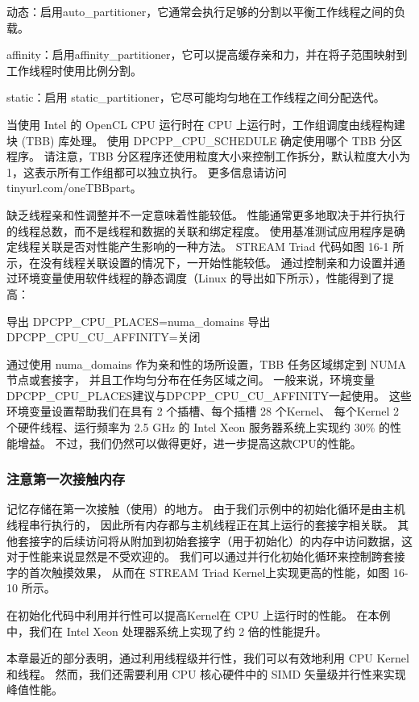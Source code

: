 动态：启用auto\_partitioner，它通常会执行足够的分割以平衡工作线程之间的负载。

affinity：启用affinity\_partitioner，它可以提高缓存亲和力，并在将子范围映射到工作线程时使用比例分割。

static：启用 static\_partitioner，它尽可能均匀地在工作线程之间分配迭代。

当使用 Intel 的 OpenCL CPU 运行时在 CPU 上运行时，工作组调度由线程构建块 (TBB) 库处理。 
使用 DPCPP\_CPU\_SCHEDULE 确定使用哪个 TBB 分区程序。 
请注意，TBB 分区程序还使用粒度大小来控制工作拆分，默认粒度大小为 1，这表示所有工作组都可以独立执行。 
更多信息请访问tinyurl.com/oneTBBpart。

缺乏线程亲和性调整并不一定意味着性能较低。 
性能通常更多地取决于并行执行的线程总数，而不是线程和数据的关联和绑定程度。 
使用基准测试应用程序是确定线程关联是否对性能产生影响的一种方法。 
STREAM Triad 代码如图 16-1 所示，在没有线程关联设置的情况下，一开始性能较低。 
通过控制亲和力设置并通过环境变量使用软件线程的静态调度（Linux 的导出如下所示），性能得到了提高：

导出 DPCPP\_CPU\_PLACES=numa\_domains 导出 DPCPP\_CPU\_CU\_AFFINITY=关闭

通过使用 numa\_domains 作为亲和性的场所设置，TBB 任务区域绑定到 NUMA 节点或套接字，
并且工作均匀分布在任务区域之间。 
一般来说，环境变量DPCPP\_CPU\_PLACES建议与DPCPP\_CPU\_CU\_AFFINITY一起使用。 
这些环境变量设置帮助我们在具有 2 个插槽、每个插槽 28 个Kernel、
每个Kernel 2 个硬件线程、运行频率为 2.5 GHz 的 Intel Xeon 服务器系统上实现约 30\% 的性能增益。 
不过，我们仍然可以做得更好，进一步提高这款CPU的性能。

\subsubsection{注意第一次接触内存}
记忆存储在第一次接触（使用）的地方。 由于我们示例中的初始化循环是由主机线程串行执行的，
因此所有内存都与主机线程正在其上运行的套接字相关联。 
其他套接字的后续访问将从附加到初始套接字（用于初始化）的内存中访问数据，这对于性能来说显然是不受欢迎的。 
我们可以通过并行化初始化循环来控制跨套接字的首次触摸效果，
从而在 STREAM Triad Kernel上实现更高的性能，如图 16-10 所示。

在初始化代码中利用并行性可以提高Kernel在 CPU 上运行时的性能。 
在本例中，我们在 Intel Xeon 处理器系统上实现了约 2 倍的性能提升。

本章最近的部分表明，通过利用线程级并行性，我们可以有效地利用 CPU Kernel和线程。 
然而，我们还需要利用 CPU 核心硬件中的 SIMD 矢量级并行性来实现峰值性能。

